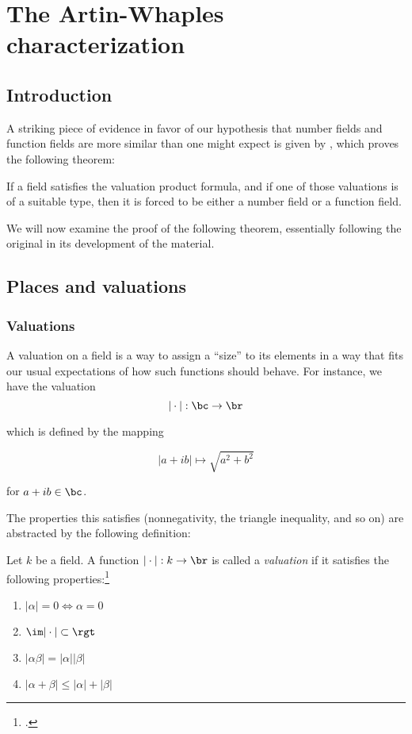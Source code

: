 \chapter{The Artin-Whaples characterization}
\section{Introduction}
\label{sec:orgheadline1}

A striking piece of evidence in favor of our hypothesis that number fields and
function fields are more similar than one might expect is given by
\cite{artinwhaples}, which proves the following theorem:

\begin{thm}
  If a field satisfies the valuation product formula, and if one of those
  valuations is of a suitable type, then it is forced to be either a number
  field or a function field.
\end{thm}

We will now examine the proof of the following theorem, essentially following
the original in its development of the material.

\section{Places and valuations}
\label{sec:orgheadline6}

\subsection{Valuations}
\label{sec:valuations}

A valuation on a field is a way to assign a ``size'' to its elements in a way
that fits our usual expectations of how such functions should behave. For
instance, we have the valuation
\[ |\cdot| : \bc \to \br \]

which is defined by the mapping

 \[ |a + ib| \mapsto \sqrt{a^2 + b^2} \]

for $a+ib\in\bc$.

The properties this satisfies (nonnegativity, the triangle inequality, and so
on) are abstracted by the following definition:

\begin{defn}
  Let $k$ be a field. A function $|\cdot|: k\to\br$ is called a
  \textit{valuation} if it satisfies the following properties:\footcite[section
  1]{artinwhaples}
  \begin{enumerate}
  \item $|\alpha| = 0 \iff \alpha = 0$
  \item $\im |\cdot|\subset \rgt$
  \item $|\alpha\beta| = |\alpha||\beta|$
  \item $|\alpha + \beta| \leq |\alpha| + |\beta|$
  \end{enumerate}
\end{defn}

